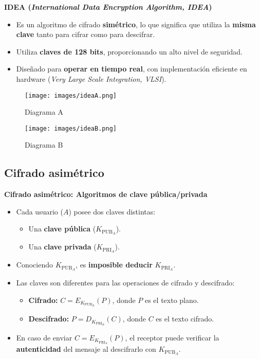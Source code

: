 \documentclass[a4paper,12pt]{article}
\begin{document}
\newpage

\textbf{IDEA (\textit{International Data Encryption Algorithm, IDEA})}

\begin{itemize}
    \item Es un algoritmo de cifrado \textbf{simétrico}, lo que significa que utiliza la \textbf{misma clave} tanto para cifrar como para descifrar.
    \item Utiliza \textbf{claves de 128 bits}, proporcionando un alto nivel de seguridad.
    \item Diseñado para \textbf{operar en tiempo real}, con implementación eficiente en hardware (\textit{Very Large Scale Integration, VLSI}).
\end{itemize}

\begin{figure}[H]
    \centering
    \begin{minipage}{0.45\textwidth}
        \centering
        \texttt{[image: images/ideaA.png]}
        \caption{Diagrama A}
    \end{minipage}
    \hfill
    \begin{minipage}{0.45\textwidth}
        \centering
        \texttt{[image: images/ideaB.png]}
        \caption{Diagrama B}
    \end{minipage}
\end{figure}

\subsection{Cifrado asimétrico}

\textbf{Cifrado asimétrico: Algoritmos de clave pública/privada}

\begin{itemize}
    \item Cada usuario (\(A\)) posee dos claves distintas:
    \begin{itemize}
        \item Una \textbf{clave pública} (\(K_{\text{PUB}_A}\)).
        \item Una \textbf{clave privada} (\(K_{\text{PRI}_A}\)).
    \end{itemize}
    \item Conociendo \(K_{\text{PUB}_A}\), es \textbf{imposible deducir} \(K_{\text{PRI}_A}\).
    \item Las claves son diferentes para las operaciones de cifrado y descifrado:
    \begin{itemize}
        \item \textbf{Cifrado:} \(C = E_{K_{\text{PUB}_B}}(P)\), donde \(P\) es el texto plano.
        \item \textbf{Descifrado:} \(P = D_{K_{\text{PRI}_B}}(C)\), donde \(C\) es el texto cifrado.
    \end{itemize}
    \item En caso de enviar \(C = E_{K_{\text{PRI}_A}}(P)\), el receptor puede verificar la \textbf{autenticidad} del mensaje al descifrarlo con \(K_{\text{PUB}_A}\).
\end{itemize}
\end{document}

